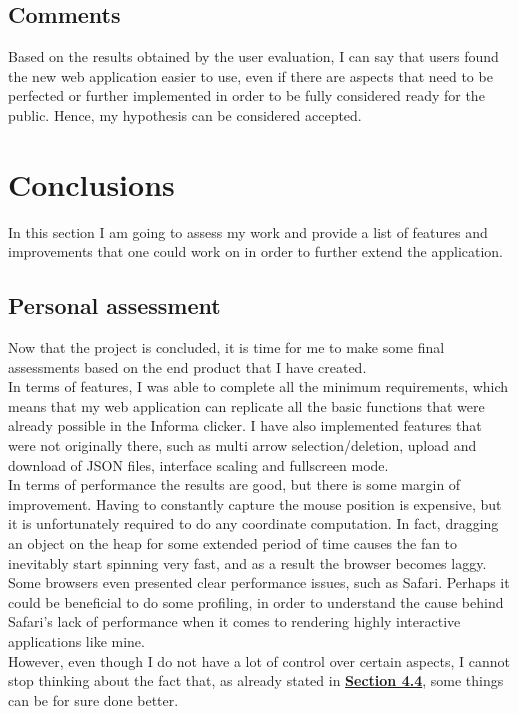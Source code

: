 \documentclass[]{usiinfbachelorproject}
\begin{document}
\subsection{Comments}

Based on the results obtained by the user evaluation, I can say that users found the new web application easier to use, even if there are aspects that need to be perfected or further implemented in order to be fully considered ready for the public. Hence, my hypothesis can be considered accepted.

\vspace{\fill}
\pagebreak

\section{Conclusions} \label{Conclusions}

In this section I am going to assess my work and provide a list of features and improvements that one could work on in order to further extend the application.

\subsection{Personal assessment}

Now that the project is concluded, it is time for me to make some final assessments based on the end product that I have created. \\
In terms of features, I was able to complete all the minimum requirements, which means that my web application can replicate all the basic functions that were already possible in the Informa clicker. I have also implemented features that were not originally there, such as multi arrow selection/deletion, upload and download of JSON files, interface scaling and fullscreen mode.\\
In terms of performance the results are good, but there is some margin of improvement. Having to constantly capture the mouse position is expensive, but it is unfortunately required to do any coordinate computation. In fact, dragging an object on the heap for some extended period of time causes the fan to inevitably start spinning very fast, and as a result the browser becomes laggy. Some browsers even presented clear performance issues, such as Safari. Perhaps it could be beneficial to do some profiling, in order to understand the cause behind Safari's lack of performance when it comes to rendering highly interactive applications like mine. \\
However, even though I do not have a lot of control over certain aspects, I cannot stop thinking about the fact that, as already stated in \hyperref[storing states]{\textbf{Section 4.4}}, some things can be for sure done better.
\end{document}
